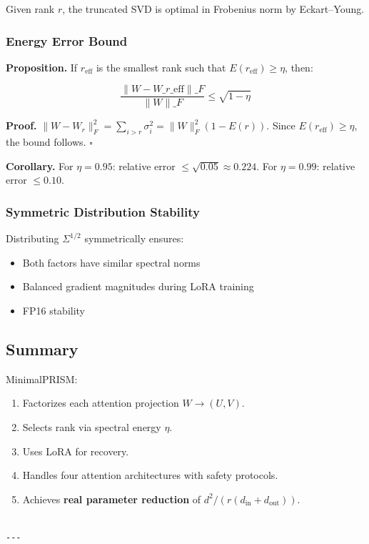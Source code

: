 Given rank $r$, the truncated SVD is optimal in Frobenius norm by 
Eckart--Young.

\subsubsection{Energy Error Bound}

\textbf{Proposition.} If $r_\text{eff}$ is the smallest rank such that 
$E(r_\text{eff}) \geq \eta$, then:

\[
\frac{\|W - W\_{r\_\text{eff}}\|\_F}{\|W\|\_F} \leq \sqrt{1 - \eta}
\tag{4.9}
\]

\textbf{Proof.} $\|W - W_r\|_F^2 = \sum_{i > r} \sigma_i^2 = \|W\|_F^2 (1 - E(r))$. 
Since $E(r_\text{eff}) \geq \eta$, the bound follows. $\square$

\textbf{Corollary.} For $\eta = 0.95$: relative error $\leq \sqrt{0.05} \approx 0.224$. 
For $\eta = 0.99$: relative error $\leq 0.10$.

\subsubsection{Symmetric Distribution Stability}

Distributing $\Sigma^{1/2}$ symmetrically ensures:
\begin{itemize}
\item Both factors have similar spectral norms
\item Balanced gradient magnitudes during LoRA training
\item FP16 stability

\end{itemize}
\subsection{Summary}

MinimalPRISM:
\begin{enumerate}
\item Factorizes each attention projection $W \to (U, V)$.
\item Selects rank via spectral energy $\eta$.
\item Uses LoRA for recovery.
\item Handles four attention architectures with safety protocols.
\item Achieves \textbf{real parameter reduction} of $d^2 / (r(d_\text{in} + d_\text{out}))$.
\end{enumerate}
\begin{lstlisting}

---
\end{lstlisting}